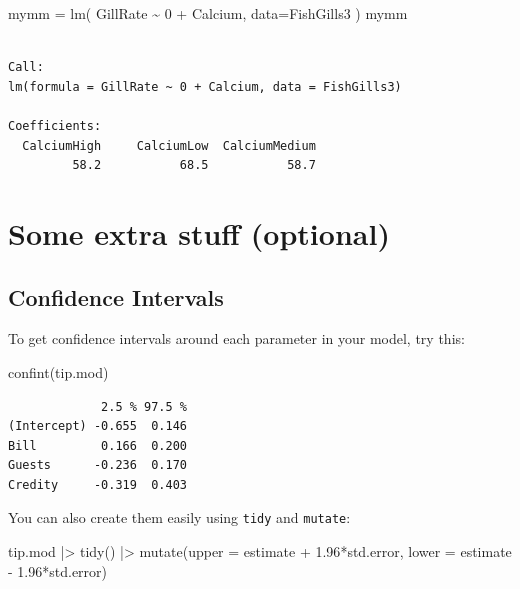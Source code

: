 \documentclass[
  letterpaper,
  DIV=11,
  numbers=noendperiod]{scrreprt}
\newenvironment{Shaded}{\begin{snugshade}}{\end{snugshade}}
\newcommand{\AttributeTok}[1]{\textcolor[rgb]{0.49,0.56,0.16}{#1}}
\newcommand{\DecValTok}[1]{\textcolor[rgb]{0.25,0.63,0.44}{#1}}
\newcommand{\FloatTok}[1]{\textcolor[rgb]{0.25,0.63,0.44}{#1}}
\newcommand{\FunctionTok}[1]{\textcolor[rgb]{0.02,0.16,0.49}{#1}}
\newcommand{\NormalTok}[1]{\textcolor[rgb]{0.00,0.44,0.13}{#1}}
\newcommand{\OtherTok}[1]{\textcolor[rgb]{0.00,0.44,0.13}{#1}}
\newcommand{\SpecialCharTok}[1]{\textcolor[rgb]{0.25,0.44,0.63}{#1}}
\begin{document}
\begin{Shaded}
\begin{Highlighting}[]
\NormalTok{mymm }\OtherTok{=} \FunctionTok{lm}\NormalTok{( GillRate }\SpecialCharTok{\textasciitilde{}} \DecValTok{0} \SpecialCharTok{+}\NormalTok{ Calcium, }\AttributeTok{data=}\NormalTok{FishGills3 )}
\NormalTok{mymm}
\end{Highlighting}
\end{Shaded}

\begin{verbatim}

Call:
lm(formula = GillRate ~ 0 + Calcium, data = FishGills3)

Coefficients:
  CalciumHigh     CalciumLow  CalciumMedium  
         58.2           68.5           58.7  
\end{verbatim}

\hypertarget{some-extra-stuff-optional}{%
\section{Some extra stuff (optional)}\label{some-extra-stuff-optional}}

\hypertarget{confidence-intervals}{%
\subsection{Confidence Intervals}\label{confidence-intervals}}

To get confidence intervals around each parameter in your model, try
this:

\begin{Shaded}
\begin{Highlighting}[]
\FunctionTok{confint}\NormalTok{(tip.mod)}
\end{Highlighting}
\end{Shaded}

\begin{verbatim}
             2.5 % 97.5 %
(Intercept) -0.655  0.146
Bill         0.166  0.200
Guests      -0.236  0.170
Credity     -0.319  0.403
\end{verbatim}

You can also create them easily using \texttt{tidy} and \texttt{mutate}:

\begin{Shaded}
\begin{Highlighting}[]
\NormalTok{tip.mod }\SpecialCharTok{|\textgreater{}} 
  \FunctionTok{tidy}\NormalTok{() }\SpecialCharTok{|\textgreater{}} 
  \FunctionTok{mutate}\NormalTok{(}\AttributeTok{upper =}\NormalTok{ estimate }\SpecialCharTok{+} \FloatTok{1.96}\SpecialCharTok{*}\NormalTok{std.error,}
         \AttributeTok{lower =}\NormalTok{ estimate }\SpecialCharTok{{-}} \FloatTok{1.96}\SpecialCharTok{*}\NormalTok{std.error)}
\end{Highlighting}
\end{Shaded}
\end{document}
